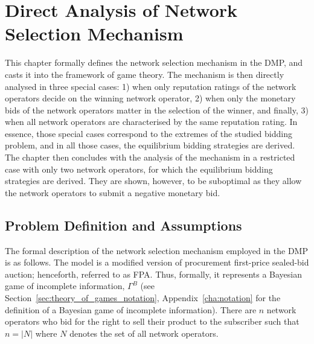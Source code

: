 \chapter{Direct Analysis of Network Selection Mechanism} %
\label{cha:direct}

This chapter formally defines the network selection mechanism in the DMP, and casts it into the framework of game theory. The mechanism is then directly analysed in three special cases: 1) when only reputation ratings of the network operators decide on the winning network operator, 2) when only the monetary bids of the network operators matter in the selection of the winner, and finally, 3) when all network operators are characterised by the same reputation rating. In essence, those special cases correspond to the extremes of the studied bidding problem, and in all those cases, the equilibrium bidding strategies are derived. The chapter then concludes with the analysis of the mechanism in a restricted case with only two network operators, for which the equilibrium bidding strategies are derived. They are shown, however, to be suboptimal as they allow the network operators to submit a negative monetary bid.

\section{Problem Definition and Assumptions} %
\label{sec:problem_definition_and_assumptions_direct}
The formal description of the network selection mechanism employed in the DMP is as follows. The model is a modified version of procurement first-price sealed-bid auction; henceforth, referred to as FPA. Thus, formally, it represents a Bayesian game of incomplete information, $\Gamma^B$ (see Section~\ref{sec:theory_of_games_notation}, Appendix~\ref{cha:notation} for the definition of a Bayesian game of incomplete information). There are $n$ network operators who bid for the right to sell their product to the subscriber such that $n = |N|$ where $N$ denotes the set of all network operators.

